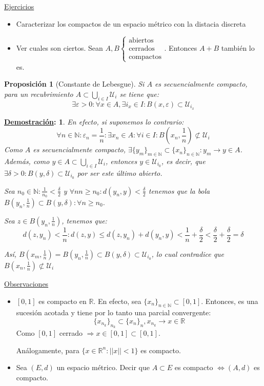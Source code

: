 \documentclass[10pt,a4paper,openright]{book}
\theoremstyle{break}
\newtheorem*{prop}{Proposición}
\newtheorem*{demo}{\underline{Demostración}:}
\begin{document}
\underline{Ejercicios}
\begin{itemize}
\item Caracterizar los compactos de un espacio métrico con la distacia discreta

\item Ver cuales son ciertos. Sean $A, B \begin{cases} \mbox{abiertos} \\ \mbox{cerrados} \\ \mbox{compactos} \end{cases}$. Entonces $A + B$ también lo es.
\end{itemize}

\begin{prop}[Constante de Lebesgue]
Si $A$ es secuencialmente compacto, para un recubrimiento $A \subset \bigcup_{i \in I} \mathcal{U}_i$ se tiene que:
$$\exists \varepsilon > 0 : \forall x \in A, \exists i_x \in I : B(x, \varepsilon) \subset \mathcal{U}_{i_x}$$
\end{prop}

\begin{demo}
En efecto, si suponemos lo contrario:
$$\forall n \in \mathbb{N} : \varepsilon_n = \frac{1}{n}: \exists x_n \in A : \forall i \in I: B\left(x_n, \frac{1}{n}\right) \not\subset \mathcal{U}_i$$
Como $A$ es secuencialmente compacto, $\exists \{y_m\}_{m \in \mathbb{N}} \subset \{ x_n\}_{n \in \mathbb{N}} : y_m \to y \in A$. Además, como $y \in A \subset \bigcup_{i \in I} \mathcal{U}_i$, entonces $y \in \mathcal{U}_{i_0}$, es decir, que $\exists \delta > 0 : B(y, \delta) \subset \mathcal{U}_{i_0}$ por ser este último abierto.

Sea $n_0 \in \mathbb{N} : \frac{1}{n_0} < \frac{\delta}{2}$ y $\forall nn \geq n_0: d(y_n, y)< \frac{\delta}{2}$ tenemos que la bola $B(y_n, \frac{1}{n}) \subset B(y,\delta) : \forall n\geq n_0$.

Sea $z \in B(y_n, \frac{1}{n})$, tenemos que:
$$d(z, y_n) < \frac{1}{n} : d(z,y) \leq d(z,y_n)+ d(y_n,y) < \frac{1}{n} + \frac{\delta}{2} < \frac{\delta}{2} + \frac{\delta}{2} = \delta$$

Así, $B(x_m, \frac{1}{n})=B(y_n,\frac{1}{n})\subset B(y,\delta) \subset \mathcal{U}_{i_0}$, lo cual contradice que $B(x_n, \frac{1}{n}) \not\subset \mathcal{U}_i$
\end{demo}

\underline{Observaciones}
\begin{itemize}
\item $[0,1]$ es compacto en $\mathbb{R}$. En efecto, sea $\{x_n\}_{n \in \mathbb{N}} \subset [0,1]$. Entonces, es una sucesión acotada y tiene por lo tanto una parcial convergente: $$\{x_{n_k}\}_{n_k} \subset \{x_n\}_n, x_{n_k} \to x \in \mathbb{R}$$
Como $[0,1]$ cerrado $\Rightarrow x \in [0,1] \subset [0,1]$.

Análogamente, para $\{x \in \mathbb{R}^n : ||x|| < 1\}$ es compacto.

\item Sea $(E,d)$ un espacio métrico. Decir que $A \subset E$ es compacto $\Leftrightarrow (A,d)$ es compacto.

\end{itemize}
\end{document}
